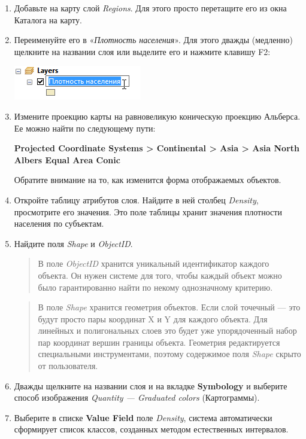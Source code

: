 \documentclass[]{book}
\theoremstyle{definition}
\theoremstyle{definition}
\theoremstyle{definition}
\theoremstyle{remark}
\begin{document}
\begin{enumerate}
\def\labelenumi{\arabic{enumi}.}
\item
  Добавьте на карту слой \emph{Regions}. Для этого просто перетащите его
  из окна Каталога на карту.
\item
  Переименуйте его в «\emph{Плотность населения}». Для этого дважды
  (медленно) щелкните на названии слоя или выделите его и нажмите
  клавишу F2:

  \includegraphics{images/Ex04/image8.png}
\item
  Измените проекцию карты на равновеликую коническую проекцию Альберса.
  Ее можно найти по следующему пути:

  \textbf{Projected Coordinate Systems \textgreater{} Continental
  \textgreater{} Asia \textgreater{} Asia North Albers Equal Area Conic}

  Обратите внимание на то, как изменится форма отображаемых объектов.
\item
  Откройте таблицу атрибутов слоя. Найдите в ней столбец \emph{Density},
  просмотрите его значения. Это поле таблицы хранит значения плотности
  населения по субъектам.
\item
  Найдите поля \emph{Shape} и \emph{ObjectID}.

  \begin{quote}
  В поле \emph{ObjectID} хранится уникальный идентификатор каждого
  объекта. Он нужен системе для того, чтобы каждый объект можно было
  гарантированно найти по некому однозначному критерию.
  \end{quote}

  \begin{quote}
  В поле \emph{Shape} хранится геометрия объектов. Если слой точечный
  --- это будут просто пары координат X и Y для каждого объекта. Для
  линейных и полигональных слоев это будет уже упорядоченный набор пар
  координат вершин границы объекта. Геометрия редактируется специальными
  инструментами, поэтому содержимое поля \emph{Shape} скрыто от
  пользователя.
  \end{quote}
\item
  Дважды щелкните на названии слоя и на вкладке \textbf{Symbology} и
  выберите способ изображения \emph{Quantity --- Graduated colors}
  (Картограммы).
\item
  Выберите в списке \textbf{Value Field} поле \emph{Density}, система
  автоматически сформирует список классов, созданных методом
  естественных интервалов.


\end{enumerate}
\end{document}
